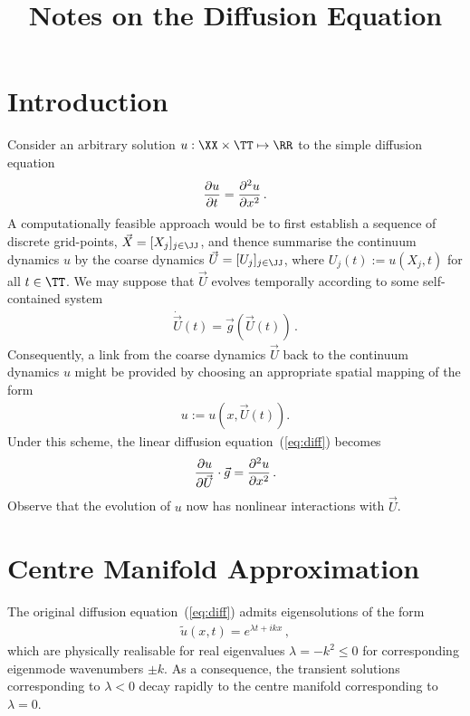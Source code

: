 \documentclass[12pt,a5paper]{article}
\title{Notes on the Diffusion Equation}
\begin{document}
\maketitle
\section{Introduction}\label{sec:intro}
Consider an arbitrary solution $u:\XX\times \TT\mapsto \RR$ to the simple diffusion equation 
\begin{eqnarray}
	\D tu = \DD xu\,.
	\label{eq:diff}
\end{eqnarray}
A computationally feasible approach would be to 
first establish a sequence  of discrete grid-points,
${\vec X}=[X_j]_{j\in\JJ}$, and thence
summarise the continuum dynamics $u$ by the coarse dynamics
${\vec U}=[U_j]_{j\in\JJ}$, where $U_j(t):=u(X_j,t)$ for all $t\in \TT$.
We may suppose  that ${\vec U}$ evolves temporally according to some self-contained system
\begin{eqnarray}
	\dot{\vec U}(t) = {\vec g}({\vec U}(t))\,.
	\label{eq:temporal}
\end{eqnarray}
Consequently, a link from the coarse dynamics ${\vec U}$ back to the continuum dynamics $u$ might be provided
by choosing an appropriate spatial mapping of the form
\begin{eqnarray}
	u  := u(x,{\vec U}(t)).
	\label{eq:spatial}
\end{eqnarray}
Under this scheme, the linear diffusion equation~(\ref{eq:diff}) becomes
\begin{eqnarray}
	\D {\vec U}{u}\cdot{\vec g} = \DD x{u}\,.
	\label{eq:diff2}
\end{eqnarray}
Observe that the evolution of $u$ now has nonlinear interactions with ${\vec U}$.

\section{Centre Manifold Approximation}\label{sec:centre-man}
The original diffusion equation~(\ref{eq:diff}) admits 
eigensolutions of the form
\begin{eqnarray}
	\tilde{u}(x,t)  = e^{\lambda t+ikx}\,,
\label{eq:raw-eigmode}
\end{eqnarray}
which are physically realisable for real eigenvalues $\lambda=-k^2\le 0$ for 
corresponding eigenmode wavenumbers $\pm k$. 
As a consequence, the transient solutions corresponding
to $\lambda<0$ decay rapidly to the centre manifold corresponding to $\lambda=0$. 
\end{document}
